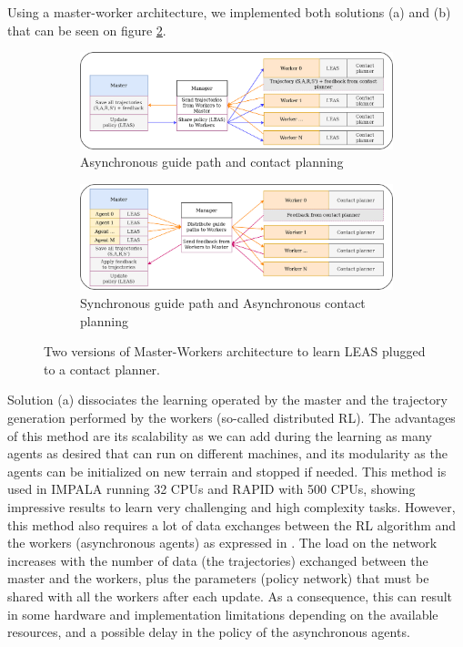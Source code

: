 Using a master-worker architecture, we implemented both solutions (a) and (b) that can be seen on figure \ref{fig:architecture_master_worker}.
\begin{figure}
    \captionsetup[subfigure]{justification=centering}
    \begin{subfigure}[t]{\linewidth}
    \includegraphics[width=\textwidth]{Figures/Chapter_LEAS/architecture_master_worker_0.png}
    \caption{Asynchronous guide path and contact planning}
    \end{subfigure}
    \begin{subfigure}[t]{\linewidth}
    \includegraphics[width=\textwidth]{Figures/Chapter_LEAS/architecture_master_worker_1.png}
    \caption{Synchronous guide path and Asynchronous contact planning}
    \label{fig:architecture_master_worker_asynchronous}
    \end{subfigure}
    \caption{Two versions of Master-Workers architecture to learn LEAS plugged to a contact planner.}
    \label{fig:architecture_master_worker}
\end{figure}

Solution (a) dissociates the learning operated by the master and the trajectory generation performed by the workers (so-called distributed RL).
The advantages of this method are its scalability as we can add during the learning as many agents as desired that can run on different machines, and its modularity as the agents can be initialized on new terrain and stopped if needed.
This method is used in IMPALA \cite{impala2018} running 32 CPUs and RAPID \cite{openai2019dota} with 500 CPUs, showing impressive results to learn very challenging and high complexity tasks.
However, this method also requires a lot of data exchanges between the RL algorithm and the workers (asynchronous agents) as expressed in \cite{deepRLvsES}. 
The load on the network increases with the number of data (the trajectories) exchanged between the master and the workers, plus the parameters (policy network) that must be shared with all the workers after each update.
As a consequence, this can result in some hardware and implementation limitations depending on the available resources, and a possible delay in the policy of the asynchronous agents.

